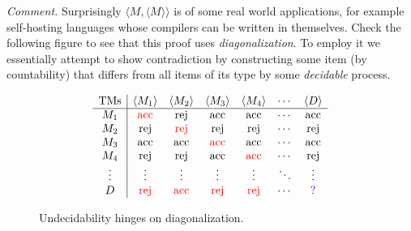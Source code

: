 \textit{Comment.} Surprisingly $\langle M,\langle M\rangle\rangle$ is of some real world applications, for example self-hosting languages whose compilers can be written in themselves. Check the following figure to see that this proof uses \textit{diagonalization}. To employ it we essentially attempt to show contradiction by constructing some item (by countability) that differs from all items of its type by some \textit{decidable} process.
\begin{figure}[H]
  \[
    \begin{array}{c|cccccc}
      \text{TMs} & \langle M_1 \rangle         & \langle M_2 \rangle         & \langle M_3 \rangle         & \langle M_4 \rangle         & \cdots & \langle D \rangle   \\
      \hline
      M_1        & \textcolor{red}{\text{acc}} & \text{rej}                  & \text{acc}                  & \text{acc}                  & \cdots & \text{acc}          \\
      M_2        & \text{rej}                  & \textcolor{red}{\text{rej}} & \text{rej}                  & \text{rej}                  & \cdots & \text{rej}          \\
      M_3        & \text{acc}                  & \text{acc}                  & \textcolor{red}{\text{acc}} & \text{acc}                  & \cdots & \text{acc}          \\
      M_4        & \text{rej}                  & \text{rej}                  & \text{acc}                  & \textcolor{red}{\text{acc}} & \cdots & \text{rej}          \\
      \vdots     & \vdots                      & \vdots                      & \vdots                      & \vdots                      & \ddots & \vdots              \\
      D          & \textcolor{red}{\text{rej}} & \textcolor{red}{\text{acc}} & \textcolor{red}{\text{rej}} & \textcolor{red}{\text{rej}} & \cdots & \textcolor{blue}{?}
    \end{array}
  \]
  \caption{Undecidability hinges on diagonalization.}
\end{figure}


